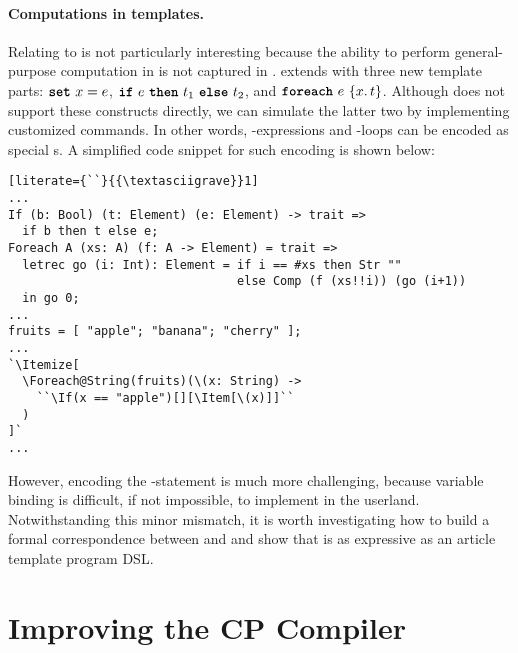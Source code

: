 \paragraph{Computations in templates.}
Relating \ExT to \DArtTLit is not particularly interesting because the ability
to perform general-purpose computation in \ExT is not captured in \DArtTLit.
\DArtTProg extends \DArtTLit with three new template parts: $\text{\ttfamily\bfseries set}\ x = e$,
$\kw{if}\ e\ \kw{then}\ t_1\ \kw{else}\ t_2$, and $\kw{foreach}\ e\ \{x.\,t\}$.
Although \ExT does not support these constructs directly, we can simulate the
latter two by implementing customized commands. In other words,
-expressions and -loops can be encoded as special s.
A simplified code snippet for such encoding is shown below:
\begin{lstlisting}[literate={``}{{\textasciigrave}}1]
...
If (b: Bool) (t: Element) (e: Element) -> trait =>
  if b then t else e;
Foreach A (xs: A) (f: A -> Element) = trait =>
  letrec go (i: Int): Element = if i == #xs then Str ""
                                else Comp (f (xs!!i)) (go (i+1))
  in go 0;
...
fruits = [ "apple"; "banana"; "cherry" ];
...
`\Itemize[
  \Foreach@String(fruits)(\(x: String) ->
    ``\If(x == "apple")[][\Item[\(x)]]``
  )
]`
...
\end{lstlisting}
However, encoding the -statement is much more challenging, because
variable binding is difficult, if not impossible, to implement in the userland.
Notwithstanding this minor mismatch, it is worth investigating how to build a
formal correspondence between \ExT and \DArtTProg and show that \ExT is as
expressive as an article template program DSL.

\section{Improving the CP Compiler}

